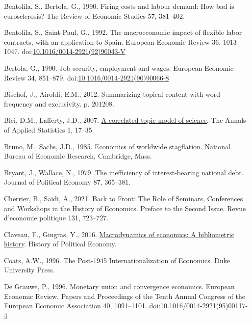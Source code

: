\documentclass[]{elsarticle} %
\newlength{\cslhangindent}
\newlength{\cslentryspacingunit} %
\newenvironment{CSLReferences}[2] %
 {%
  \setlength{\parindent}{0pt}
  \ifodd #1
  \let\oldpar\par
  \def\par{\hangindent=\cslhangindent\oldpar}
  \fi
  \setlength{\parskip}{#2\cslentryspacingunit}
 }%
 {}
\begin{document}
\begin{CSLReferences}{1}{0}
\leavevmode{}%
Bentolila, S., Bertola, G., 1990. Firing costs and labour demand: How
bad is eurosclerosis? The Review of Economic Studies 57, 381--402.

\leavevmode{}%
Bentolila, S., Saint-Paul, G., 1992. The macroeconomic impact of
flexible labor contracts, with an application to {Spain}. European
Economic Review 36, 1013--1047.
doi:\href{https://doi.org/10.1016/0014-2921(92)90043-V}{10.1016/0014-2921(92)90043-V}

\leavevmode{}%
Bertola, G., 1990. Job security, employment and wages. European Economic
Review 34, 851--879.
doi:\href{https://doi.org/10.1016/0014-2921(90)90066-8}{10.1016/0014-2921(90)90066-8}

\leavevmode{}%
Bischof, J., Airoldi, E.M., 2012. Summarizing topical content with word
frequency and exclusivity. p. 201208.

\leavevmode{}%
Blei, D.M., Lafferty, J.D., 2007.
\href{https://www.jstor.org/stable/4537420}{A correlated topic model of
science}. The Annals of Applied Statistics 1, 17--35.

\leavevmode{}%
Bruno, M., Sachs, J.D., 1985. Economics of worldwide stagflation.
{National Bureau of Economic Research}, {Cambridge, Mass.}

\leavevmode{}%
Bryant, J., Wallace, N., 1979. The inefficiency of interest-bearing
national debt. Journal of Political Economy 87, 365--381.

\leavevmode{}%
Cherrier, B., Saïdi, A., 2021. Back to {Front}: {The Role} of
{Seminars}, {Conferences} and {Workshops} in the {History} of
{Economics}. {Preface} to the {Second Issue}. Revue d'economie politique
131, 723--727.

\leavevmode{}%
Claveau, F., Gingras, Y., 2016.
\href{http://hope.dukejournals.org/cgi/content/short/48/4/551?rss=1}{Macrodynamics
of economics: A bibliometric history}. History of Political Economy.

\leavevmode{}%
Coats, A.W., 1996. The Post-1945 Internationalization of Economics. Duke
University Press.

\leavevmode{}%
De Grauwe, P., 1996. Monetary union and convergence economics. European
Economic Review, Papers and {Proceedings} of the {Tenth Annual Congress}
of the {European Economic Association} 40, 1091--1101.
doi:\href{https://doi.org/10.1016/0014-2921(95)00117-4}{10.1016/0014-2921(95)00117-4}


\end{CSLReferences}
\end{document}
